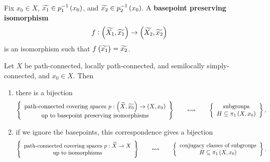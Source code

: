 
Fix $ x_0 \in X $, $ \widetilde{x_1} \in p_1^{-1}\br{x_0} $, and $ \widetilde{x_2} \in p_2^{-1}\br{x_0} $. A \textbf{basepoint preserving isomorphism}
$$ f : \br{\widetilde{X_1}, \widetilde{x_1}} \to \br{\widetilde{X_2}, \widetilde{x_2}} $$
is an isomorphism such that $ f\br{\widetilde{x_1}} = \widetilde{x_2} $.

\begin{theorem}
Let $ X $ be path-connected, locally path-connected, and semilocally simply-connected, and $ x_0 \in X $. Then
\begin{enumerate}
\item there is a bijection
$$ \correspondence{\text{path-connected covering spaces} \ p : \br{\widetilde{X}, \widetilde{x_0}} \to \br{X, x_0} \\ \text{up to basepoint preserving isomorphisms}}{\text{subgroups} \\ H \subseteq \pi_1\br{X, x_0}}, $$
\item if we ignore the basepoints, this correspondence gives a bijection
$$ \correspondence{\text{path-connected covering spaces} \ p : \widetilde{X} \to X \\ \text{up to isomorphisms}}{\text{conjugacy classes of subgroups} \\ H \subseteq \pi_1\br{X, x_0}}. $$
\end{enumerate}
\end{theorem}

